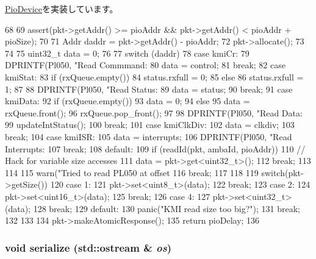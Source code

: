 \hyperlink{classPioDevice_a842312590432036092c422c87a442358}{PioDevice}を実装しています。


\begin{DoxyCode}
68 {
69     assert(pkt->getAddr() >= pioAddr && pkt->getAddr() < pioAddr + pioSize);
70 
71     Addr daddr = pkt->getAddr() - pioAddr;
72     pkt->allocate();
73 
74 
75     uint32_t data = 0;
76 
77     switch (daddr) {
78       case kmiCr:
79         DPRINTF(Pl050, "Read Commmand: %
80         data = control;
81         break;
82       case kmiStat:
83         if (rxQueue.empty())
84             status.rxfull = 0;
85         else
86             status.rxfull = 1;
87 
88         DPRINTF(Pl050, "Read Status: %
89         data = status;
90         break;
91       case kmiData:
92         if (rxQueue.empty()) {
93             data = 0;
94         } else {
95             data = rxQueue.front();
96             rxQueue.pop_front();
97         }
98         DPRINTF(Pl050, "Read Data: %
99         updateIntStatus();
100         break;
101       case kmiClkDiv:
102         data = clkdiv;
103         break;
104       case kmiISR:
105         data = interrupts;
106         DPRINTF(Pl050, "Read Interrupts: %
107         break;
108       default:
109         if (readId(pkt, ambaId, pioAddr)) {
110             // Hack for variable size accesses
111             data = pkt->get<uint32_t>();
112             break;
113         }
114 
115         warn("Tried to read PL050 at offset %
116         break;
117     }
118 
119     switch(pkt->getSize()) {
120       case 1:
121         pkt->set<uint8_t>(data);
122         break;
123       case 2:
124         pkt->set<uint16_t>(data);
125         break;
126       case 4:
127         pkt->set<uint32_t>(data);
128         break;
129       default:
130         panic("KMI read size too big?\n");
131         break;
132     }
133 
134     pkt->makeAtomicResponse();
135     return pioDelay;
136 }
\end{DoxyCode}
\hypertarget{classPl050_a53e036786d17361be4c7320d39c99b84}{
\subsubsection[{serialize}]{\setlength{\rightskip}{0pt plus 5cm}void serialize (std::ostream \& {\em os})}}
\label{classPl050_a53e036786d17361be4c7320d39c99b84}


